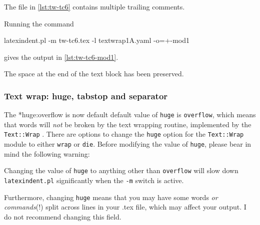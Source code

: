  \begin{example}
 The file in \cref{lst:tw-tc6} contains multiple trailing comments.

 Running the command

 \begin{commandshell}
latexindent.pl -m tw-tc6.tex -l textwrap1A.yaml -o=+-mod1 
\end{commandshell}

 gives the output in \cref{lst:tw-tc6-mod1}.
 \begin{cmhtcbraster}[raster column skip=.1\linewidth]
 \end{cmhtcbraster}
 The space at the end of the text block has been preserved.
 \end{example}

\subsubsection{Text wrap: huge, tabstop and separator}
 The *{huge:overflow is now default} default value of \texttt{huge}
 is \texttt{overflow}, which means that words will \emph{not} be broken by the text
 wrapping routine, implemented by the \texttt{Text::Wrap} \cite{textwrap}. There are
 options to change the \texttt{huge} option for the \texttt{Text::Wrap} module to either
 \texttt{wrap} or \texttt{die}. Before modifying the value of \texttt{huge}, please bear
 in mind the following warning: %
 \begin{warning}
  \raggedright
  Changing the value of \texttt{huge} to anything other than \texttt{overflow} will slow
  down \texttt{latexindent.pl} significantly when the \texttt{-m} switch is active.

  Furthermore, changing \texttt{huge} means that you may have some words \emph{or
  commands}(!) split across lines in your .tex file, which may affect your output. I do not
  recommend changing this field.
 \end{warning}

